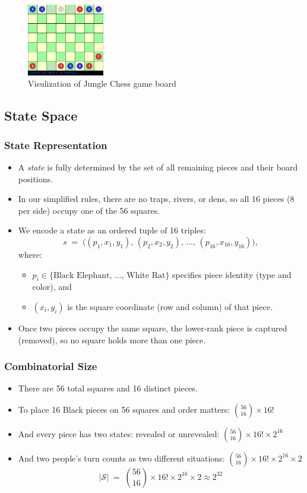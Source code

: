 \documentclass{article}
\begin{document}
\begin{figure}
    \centering
    \includegraphics[width=0.3\textwidth]{UISHOW.png}
    \caption{Visulization of Jungle Chess game board}
    \label{fig:confusion}
\end{figure}
\subsection{State Space}

\subsubsection{State Representation}
\begin{itemize}
    \item A \emph{state} is fully determined by the set of all remaining pieces and their board positions.
    \item In our simplified rules, there are no traps, rivers, or dens, so all 16 pieces (8 per side) occupy one of the 56 squares.
    \item We encode a state as an ordered tuple of 16 triples:
    \[
      s \;=\;\bigl((p_1,x_1,y_1),\, (p_2,x_2,y_2),\,\dots,\,(p_{16},x_{16},y_{16})\bigr),
    \]
    where:
    \begin{itemize}
      \item \(p_i \in \{\text{Black Elephant},\,\dots,\,\text{White Rat}\}\) specifies piece identity (type and color), and
      \item \((x_i,y_i)\) is the square coordinate (row and column) of that piece.
    \end{itemize}
    \item Once two pieces occupy the same square, the lower‐rank piece is captured (removed), so no square holds more than one piece.
\end{itemize}

\subsubsection{Combinatorial Size}
\begin{itemize}
    \item There are 56 total squares and 16 distinct pieces.
    \item To place 16 Black pieces on 56 squares and order matters: $\binom{56}{16} \times 16!$
    \item And every piece has two states: revealed or unrevealed: $\binom{56}{16} \times 16! \times 2^{16}$
    \item And two people's turn counts as two different situations: $\binom{56}{16} \times 16! \times 2^{16} \times 2$
    \[
      \bigl|\mathcal{S}\bigr|
      \;=\;\binom{56}{16} \times 16! \times 2^{16} \times 2 \approx 2^{32}
    \]
\end{itemize}
\end{document}
